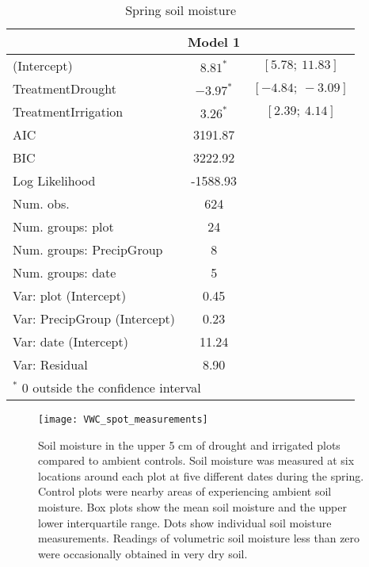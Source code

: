 \documentclass[11pt]{article}
\begin{document}
\begin{table}[h]
	\caption{Spring soil moisture}
	\centering
	\begin{tabular}{l c c }
		\hline
		& Model 1 \\
		\hline
		(Intercept)                  & $8.81^{*}$    	& $[5.78;\ 11.83]$  \\
		TreatmentDrought             & $-3.97^{*}$      & $[-4.84;\ -3.09]$ \\
		TreatmentIrrigation          & $3.26^{*}$       & $[2.39;\ 4.14]$   \\
		\hline
		AIC                          & 3191.87           \\
		BIC                          & 3222.92           \\
		Log Likelihood               & -1588.93          \\
		Num. obs.                    & 624               \\
		Num. groups: plot            & 24                \\
		Num. groups: PrecipGroup     & 8                 \\
		Num. groups: date            & 5                 \\
		Var: plot (Intercept)        & 0.45              \\
		Var: PrecipGroup (Intercept) & 0.23              \\
		Var: date (Intercept)        & 11.24             \\
		Var: Residual                & 8.90              \\
		\hline
		\multicolumn{2}{l}{\scriptsize{$^*$ 0 outside the confidence interval}}
	\end{tabular}
	\label{table:spotVWC}
\end{table}




\begin{figure}[tbp]
	\centering
	\texttt{[image: VWC\_spot\_measurements]}
	\caption{Soil moisture in the upper 5 cm of drought and irrigated plots compared to ambient controls. Soil moisture was measured at six locations around each plot at five different dates during the spring. Control plots were nearby areas of experiencing ambient soil moisture. Box plots show the mean soil moisture and the upper lower interquartile range.  Dots show individual soil moisture measurements. Readings of volumetric soil moisture less than zero were occasionally obtained in very dry soil.}
	\label{fig:VWCspot}
\end{figure}
\end{document}
